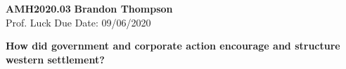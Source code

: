 \noindent
\textbf{AMH2020.03} \hfill \textbf{Brandon Thompson} \\
\normalsize Prof. Luck \hfill Due Date: 09/06/2020 \\

\begin{center}
\textbf{How did government and corporate action encourage and structure western settlement?}
\end{center}